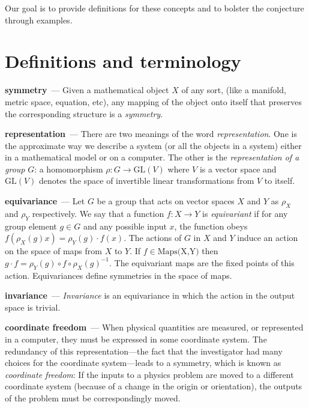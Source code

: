 \documentclass[11pt]{article}
\renewcommand{\paragraph}[1]{\medskip\par\noindent\textbf{#1}~---}
\begin{document}
Our goal is to provide definitions for these concepts and to bolster the conjecture through examples.

\section{Definitions and terminology}

\paragraph{symmetry}
Given a mathematical object $X$ of any sort, (like a manifold, metric space, equation, etc), any mapping of the object onto itself that preserves the corresponding structure is a \emph{symmetry}.

\paragraph{representation}
There are two meanings of the word \emph{representation}. One is the approximate way we describe a system (or all the objects in a system) either in a mathematical model or on a computer.
The other is the \emph{representation of a group} $G$: a homomorphism $\rho: G\to \text{GL}(V)$ where $V$ is a vector space and $\text{GL}(V)$ denotes the space of invertible linear transformations from $V$ to itself.

\paragraph{equivariance}
Let $G$ be a group that acts on vector spaces $X$ and $Y$ as $\rho_X$ and $\rho_Y$ respectively. We say that a function $f:X\to Y$ is \emph{equivariant} if for any group element $g\in G$ and any possible input $x$, the function obeys $f( \rho_X(g) x) = \rho_Y(g)\cdot f(x)$.
The actions of $G$ in $X$ and $Y$ induce an action on the space of maps from $X$ to $Y$. If $f\in \text{Maps(X,Y)}$ then $g\cdot f = \rho_Y(g)\circ f \circ \rho_X(g)^{-1}$.
The equivariant maps are the fixed points of this action.
Equivariances define symmetries in the space of maps. 

\paragraph{invariance}
\emph{Invariance} is an equivariance in which the action in the output space is trivial.

\paragraph{coordinate freedom}
When physical quantities are measured, or represented in a computer, they must be expressed in some coordinate system.
The redundancy of this representation---the fact that the investigator had many choices for the coordinate system---leads to a symmetry, which is known as \emph{coordinate freedom}:
If the inputs to a physics problem are moved to a different coordinate system (because of a change in the origin or orientation), the outputs of the problem must be correspondingly moved.
\end{document}
